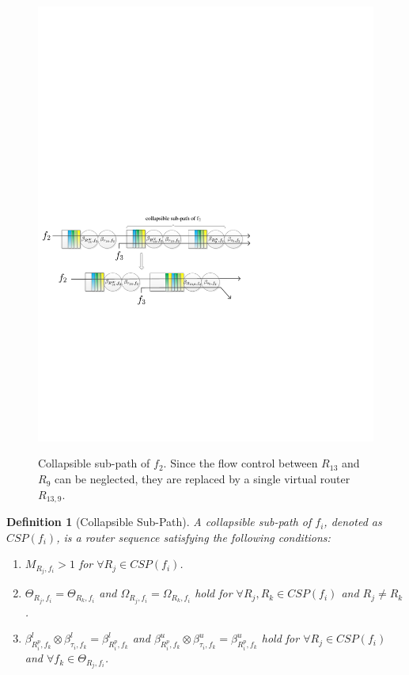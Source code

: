 \documentclass[10pt,journal]{IEEEtran}
\newtheorem{definition}{Definition}
\begin{document}
\begin{figure}
  \centering
  \includegraphics[scale=0.6]{figures/collapse.pdf}\\
  \caption{Collapsible sub-path of $f_2$. Since the flow control between $R_{13}$ and $R_9$ can be neglected, they are replaced by a single virtual router $R_{13,9}$.}\label{collapse}
\end{figure}

\begin{definition}[Collapsible Sub-Path]
A collapsible sub-path of $f_i$, denoted as $CSP(f_i)$, is a router sequence satisfying the following conditions:
\begin{enumerate}
  \item $M_{R_j,f_i}>1$ for $\forall R_j\in CSP(f_i)$.
  \item $\Theta_{R_j,f_i}=\Theta_{R_k,f_i}$ and $\Omega_{R_j,f_i}=\Omega_{R_k,f_i}$ hold for $\forall R_j,R_k\in CSP(f_i)$ and $R_j\neq R_k$.
  \item $\beta_{R_{i}^{p},f_k}^l\otimes\beta_{\tau_{i},f_k}^l=\beta_{R_{i}^{p},f_k}^l$ and $\beta_{R_{i}^{p},f_k}^u\otimes\beta_{\tau_{i},f_k}^u=\beta_{R_{i}^{p},f_k}^u$ hold for $\forall R_j\in CSP(f_i)$ and $\forall f_k\in\Theta_{R_j,f_i}$.
\end{enumerate}
\end{definition}
\end{document}
